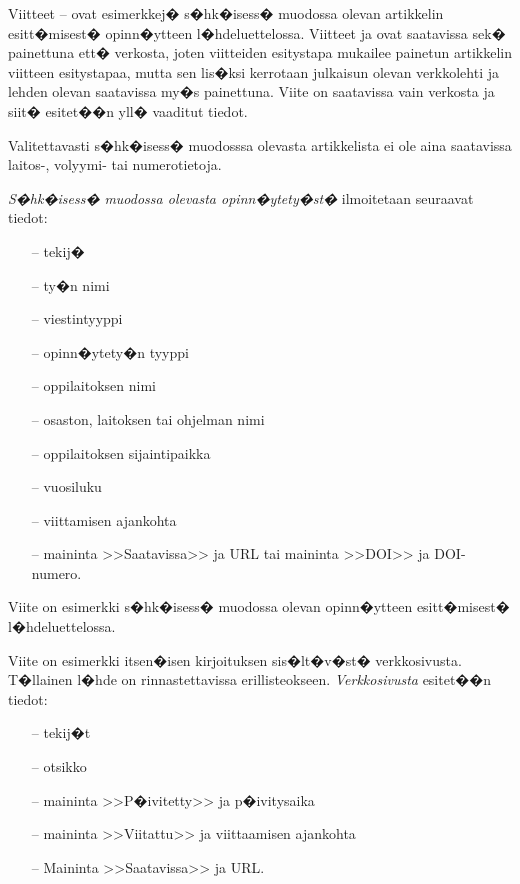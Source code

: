 \documentclass[finnish,12pt,a4paper,pdftex]{article}
\begin{document}
Viitteet \cite{Ribeiro}--\cite{kone} ovat esimerkkej� s�hk�isess�
muodossa olevan artikkelin esitt�misest� opinn�ytteen
l�hdeluettelossa.  Viitteet \cite{Ribeiro} ja \cite{Stieber} ovat
saatavissa sek� painettuna ett� verkosta, joten viitteiden esitystapa
mukailee painetun artikkelin viitteen esitystapaa, mutta sen lis�ksi
kerrotaan julkaisun olevan verkkolehti ja lehden olevan saatavissa
my�s painettuna.  Viite \cite{kone} on saatavissa vain verkosta ja
siit� esitet��n yll� vaaditut tiedot.

Valitettavasti s�hk�isess� muodosssa olevasta artikkelista ei ole aina 
saatavissa lai\-tos-, volyymi- tai numerotietoja.

\textit{S�hk�isess� muodossa olevasta opinn�ytety�st�} ilmoitetaan
seuraavat tiedot:
 
\begin{itemize}
\item[--]tekij�
\item[--]ty�n nimi
\item[--]viestintyyppi
\item[--]opinn�ytety�n tyyppi
\item[--]oppilaitoksen nimi
\item[--]osaston, laitoksen tai ohjelman nimi
\item[--]oppilaitoksen sijaintipaikka
\item[--]vuosiluku
\item[--]viittamisen ajankohta
\item[--]maininta >>Saatavissa>> ja URL tai 
        maininta >>DOI>> ja DOI-numero.
\end{itemize}

Viite \cite{Adida} on esimerkki s�hk�isess� muodossa olevan
opinn�ytteen esitt�misest� l�hdeluettelossa.

Viite \cite{viittaaminen} on esimerkki itsen�isen kirjoituksen sis�lt�v�st�
verkkosivusta. T�llainen l�hde on rinnastettavissa erillisteokseen.
\textit{Verkkosivusta} esitet��n tiedot:

\begin{itemize}
\item[--] tekij�t
\item[--] otsikko
\item[--] maininta >>P�ivitetty>> ja p�ivitysaika 
\item[--] maininta >>Viitattu>> ja viittaamisen ajankohta
\item[--] Maininta >>Saatavissa>> ja URL.
\end{itemize}
\end{document}
